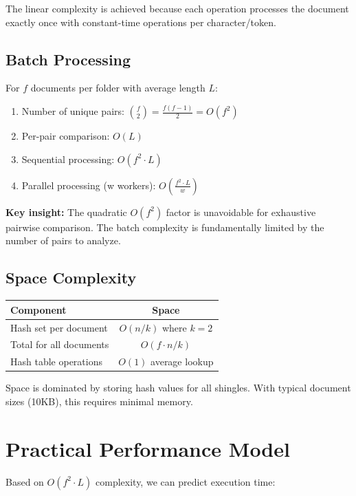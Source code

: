 \documentclass[12pt,oneside,openany]{report}
\begin{document}
The linear complexity is achieved because each operation processes the document exactly once with constant-time operations per character/token.

\subsection{Batch Processing}

For $f$ documents per folder with average length $L$:

\begin{enumerate}
  \item Number of unique pairs: ${f \choose 2} = \frac{f(f-1)}{2} = O(f^2)$
  \item Per-pair comparison: $O(L)$
  \item Sequential processing: $O(f^2 \cdot L)$
  \item Parallel processing (w workers): $O(\frac{f^2 \cdot L}{w})$
\end{enumerate}

\textbf{Key insight:} The quadratic $O(f^2)$ factor is unavoidable for exhaustive pairwise comparison. The batch complexity is fundamentally limited by the number of pairs to analyze.

\subsection{Space Complexity}

\begin{table}[H]
\centering
\begin{tabular}{|l|c|}
\hline
\textbf{Component} & \textbf{Space} \\
\hline
Hash set per document & $O(n/k)$ where $k=2$ \\
Total for all documents & $O(f \cdot n/k)$ \\
Hash table operations & $O(1)$ average lookup \\
\hline
\end{tabular}
\end{table}

Space is dominated by storing hash values for all shingles. With typical document sizes (10KB), this requires minimal memory.

\section{Practical Performance Model}

Based on $O(f^2 \cdot L)$ complexity, we can predict execution time:
\end{document}
